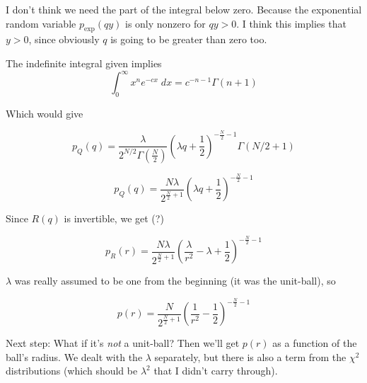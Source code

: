 \documentclass{article}
\begin{document}
I don't think we need the part of the integral below zero. Because the exponential random variable $p_\text{exp}(qy)$ is only nonzero for $qy > 0$. I think this implies that $y>0$, since obviously $q$ is going to be greater than zero too.

The indefinite integral given implies
$$
\int_{0}^{\infty} x^n e^{-cx} \; dx = c^{-n-1} \Gamma(n+1)
$$

Which would give

$$
p_Q(q) = \frac{\lambda}{2^{N/2} \Gamma(\frac{N}{2})} \left(\lambda q + \frac{1}{2}\right)^{-\frac{N}{2} - 1} \Gamma(N/2+1)
$$

$$
p_Q(q) = \frac{N\lambda}{2^{\frac{N}{2} + 1}} \left(\lambda q + \frac{1}{2}\right)^{-\frac{N}{2} - 1} 
$$

Since $R(q)$ is invertible, we get (?)

$$
p_R(r) = \frac{N\lambda}{2^{\frac{N}{2} + 1}} \left(\frac{\lambda}{r^2} -\lambda + \frac{1}{2} \right)^{-\frac{N}{2} - 1} 
$$

$\lambda$ was really assumed to be one from the beginning (it was the unit-ball), so

$$
p(r) = \frac{N}{2^{\frac{N}{2} + 1}} \left(\frac{1}{r^2} - \frac{1}{2} \right)^{-\frac{N}{2} - 1}
$$

Next step: What if it's \emph{not} a unit-ball? Then we'll get $p(r)$ as a function of the ball's radius. We dealt with the $\lambda$ separately, but there is also a term from the $\chi^2$ distributions (which should be $\lambda^2$ that I didn't carry through).
\end{document}
